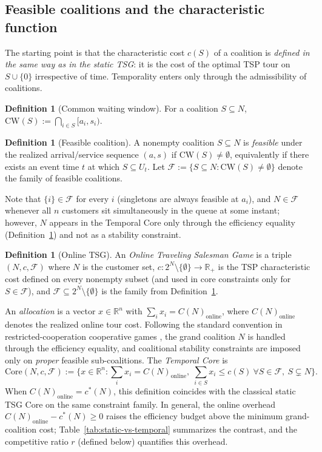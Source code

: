 \documentclass[11pt]{article}
\theoremstyle{plain}
\theoremstyle{definition}
\newtheorem{definition}[theorem]{Definition}
\theoremstyle{remark}
\newcommand{\F}{\mathcal{F}}
\newcommand{\CW}{\mathrm{CW}}
\newcommand{\cstar}{c^{\ast}}
\begin{document}
\subsection{Feasible coalitions and the characteristic function}

The starting point is that the characteristic cost $c(S)$ of a coalition is \emph{defined in the same way as in the static TSG}: it is the cost of the optimal TSP tour on $S\cup\{0\}$ irrespective of time. Temporality enters only through the admissibility of coalitions.

\begin{definition}[Common waiting window]
For a coalition $S\subseteq N$,
$\CW(S) := \bigcap_{i\in S} [a_i, s_i)$.
\end{definition}

\begin{definition}[Feasible coalition]
\label{def:feasible}
A nonempty coalition $S\subseteq N$ is \emph{feasible} under the realized arrival/service sequence $(a, s)$ if $\CW(S)\neq\emptyset$, equivalently if there exists an event time $t$ at which $S\subseteq U_t$. Let
$\F := \{S\subseteq N : \CW(S)\neq\emptyset\}$
denote the family of feasible coalitions.
\end{definition}

Note that $\{i\}\in\F$ for every $i$ (singletons are always feasible at $a_i$), and $N\in\F$ whenever all $n$ customers sit simultaneously in the queue at some instant; however, $N$ appears in the Temporal Core only through the efficiency equality (Definition~\ref{def:online-tsg}) and not as a stability constraint.

\begin{definition}[Online TSG]
\label{def:online-tsg}
An \emph{Online Traveling Salesman Game} is a triple $(N, c, \F)$ where $N$ is the customer set, $c:2^N\setminus\{\emptyset\}\to\mathbb{R}_+$ is the TSP characteristic cost defined on every nonempty subset (and used in core constraints only for $S\in\F$), and $\F\subseteq 2^N\setminus\{\emptyset\}$ is the family from Definition~\ref{def:feasible}.
\end{definition}

An \emph{allocation} is a vector $x\in\mathbb{R}^n$ with $\sum_i x_i = C(N)_{\text{online}}$, where $C(N)_{\text{online}}$ denotes the realized online tour cost. Following the standard convention in restricted-cooperation cooperative games \citep{myerson1977graphs,bilbao2000}, the grand coalition $N$ is handled through the efficiency equality, and coalitional stability constraints are imposed only on \emph{proper} feasible sub-coalitions. The \emph{Temporal Core} is
\[
\mathrm{Core}(N,c,\F) := \bigl\{ x\in\mathbb{R}^n : \textstyle\sum_i x_i = C(N)_{\text{online}},\; \sum_{i\in S} x_i \le c(S)\ \forall S\in\F,\ S\subsetneq N \bigr\}.
\]
When $C(N)_{\text{online}} = \cstar(N)$, this definition coincides with the classical \citet{potters1992tsg} static TSG Core on the same constraint family. In general, the online overhead $C(N)_{\text{online}}-\cstar(N)\ge 0$ raises the efficiency budget above the minimum grand-coalition cost; Table~\ref{tab:static-vs-temporal} summarizes the contrast, and the competitive ratio $r$ (defined below) quantifies this overhead.
\end{document}
